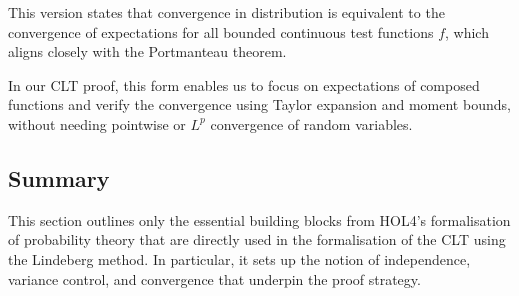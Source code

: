 This version states that convergence in distribution is equivalent to the convergence of expectations for all bounded continuous test functions $ f $, which aligns closely with the Portmanteau theorem.

In our CLT proof, this form enables us to focus on expectations of composed functions and verify the convergence using Taylor expansion and moment bounds, without needing pointwise or $ L^p $ convergence of random variables.

\subsection{Summary}

This section outlines only the essential building blocks from HOL4's formalisation of probability theory that are directly used in the formalisation of the CLT using the Lindeberg method. In particular, it sets up the notion of independence, variance control, and convergence that underpin the proof strategy.
